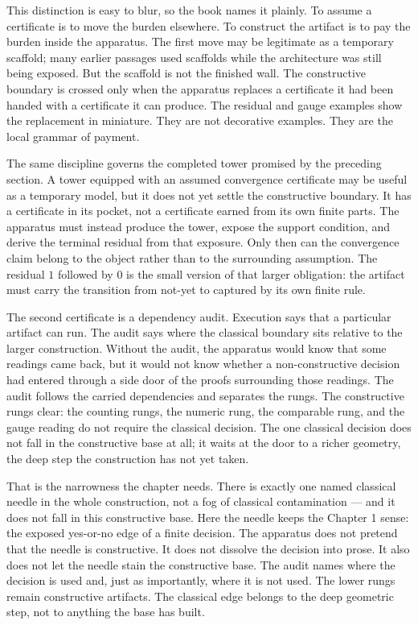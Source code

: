 This distinction is easy to blur, so the book names it plainly. To assume a
certificate is to move the burden elsewhere. To construct the artifact is to
pay the burden inside the apparatus. The first move may be legitimate as a
temporary scaffold; many earlier passages used scaffolds while the architecture
was still being exposed. But the scaffold is not the finished wall. The
constructive boundary is crossed only when the apparatus replaces a certificate
it had been handed with a certificate it can produce. The residual and gauge
examples show the replacement in miniature. They are not decorative examples.
They are the local grammar of payment.

The same discipline governs the completed tower promised by the preceding
section. A tower equipped with an assumed convergence certificate may be useful
as a temporary model, but it does not yet settle the constructive boundary. It
has a certificate in its pocket, not a certificate earned from its own finite
parts. The apparatus must instead produce the tower, expose the support
condition, and derive the terminal residual from that exposure. Only then can
the convergence claim belong to the object rather than to the surrounding
assumption. The residual \(1\) followed by \(0\) is the small version of that
larger obligation: the artifact must carry the transition from not-yet to
captured by its own finite rule.

The second certificate is a dependency audit. Execution says that a particular
artifact can run. The audit says where the classical boundary sits relative to the larger
construction. Without the audit, the apparatus would know that some
readings came back, but it would not know whether a non-constructive decision
had entered through a side door of the proofs surrounding those readings. The
audit follows the carried dependencies and separates the rungs. The constructive
rungs clear: the counting rungs, the numeric rung, the comparable rung, and the
gauge reading do not require the classical decision. The one classical decision
does not fall in the constructive base at all; it waits at the door to a richer
geometry, the deep step the construction has not yet taken.

That is the narrowness the chapter needs. There is exactly one named classical
needle in the whole construction, not a fog of classical contamination --- and it
does not fall in this constructive base.
Here the needle keeps the Chapter 1 sense: the exposed yes-or-no edge of a finite
decision. The apparatus does not pretend that the needle is constructive. It
does not dissolve the decision into prose. It also does not let the needle stain
the constructive base. The audit names where the decision is used and, just as
importantly, where it is not used. The lower rungs remain constructive artifacts.
The classical edge belongs to the deep geometric step, not to anything the base
has built.


